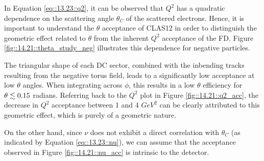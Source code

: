     In Equation \eqref{eq::13.23::q2}, it can be observed that $Q^2$ has a quadratic dependence on the scattering angle $\theta_C$ of the scattered electrons.%
    Hence, it is important to understand the $\theta$ acceptance of CLAS12 in order to distinguish the geometric effect related to $\theta$ from the inherent $Q^2$ acceptance of the FD.
    Figure \ref{fig::14.21::theta_study_neg} illustrates this dependence for negative particles.

    The triangular shape of each DC sector, combined with the inbending tracks resulting from the negative torus field, leads to a significantly low acceptance at low $\theta$ angles.
    When integrating across $\phi$, this results in a low $\theta$ efficiency for $\theta \lesssim 0.15$ radians.
    Referring back to the $Q^2$ plot in Figure \ref{fig::14.21::q2_acc}, the decrease in $Q^2$ acceptance between 1 and 4 $GeV^2$ can be clearly attributed to this geometric effect, which is purely of a geometric nature.

    On the other hand, since $\nu$ does not exhibit a direct correlation with $\theta_C$ (as indicated by Equation \eqref{eq::13.23::nu}), we can assume that the acceptance observed in Figure \ref{fig::14.21::nu_acc} is intrinsic to the detector.
